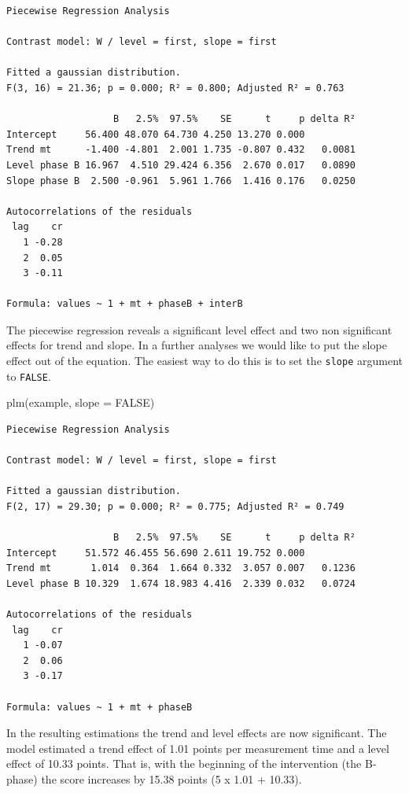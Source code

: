 \documentclass[
  letterpaper,
  DIV=11,
  numbers=noendperiod]{scrreprt}
\newenvironment{Shaded}{\begin{snugshade}}{\end{snugshade}}
\newcommand{\AttributeTok}[1]{\textcolor[rgb]{0.40,0.45,0.13}{#1}}
\newcommand{\ConstantTok}[1]{\textcolor[rgb]{0.56,0.35,0.01}{#1}}
\newcommand{\FunctionTok}[1]{\textcolor[rgb]{0.28,0.35,0.67}{#1}}
\newcommand{\NormalTok}[1]{\textcolor[rgb]{0.00,0.23,0.31}{#1}}
\begin{document}
\begin{verbatim}
Piecewise Regression Analysis

Contrast model: W / level = first, slope = first

Fitted a gaussian distribution.
F(3, 16) = 21.36; p = 0.000; R² = 0.800; Adjusted R² = 0.763

                   B   2.5%  97.5%    SE      t     p delta R²
Intercept     56.400 48.070 64.730 4.250 13.270 0.000         
Trend mt      -1.400 -4.801  2.001 1.735 -0.807 0.432   0.0081
Level phase B 16.967  4.510 29.424 6.356  2.670 0.017   0.0890
Slope phase B  2.500 -0.961  5.961 1.766  1.416 0.176   0.0250

Autocorrelations of the residuals
 lag    cr
   1 -0.28
   2  0.05
   3 -0.11

Formula: values ~ 1 + mt + phaseB + interB
\end{verbatim}

The piecewise regression reveals a significant level effect and two non
significant effects for trend and slope. In a further analyses we would
like to put the slope effect out of the equation. The easiest way to do
this is to set the \texttt{slope} argument to \texttt{FALSE}.

\begin{Shaded}
\begin{Highlighting}[]
\FunctionTok{plm}\NormalTok{(example, }\AttributeTok{slope =} \ConstantTok{FALSE}\NormalTok{)}
\end{Highlighting}
\end{Shaded}

\begin{verbatim}
Piecewise Regression Analysis

Contrast model: W / level = first, slope = first

Fitted a gaussian distribution.
F(2, 17) = 29.30; p = 0.000; R² = 0.775; Adjusted R² = 0.749

                   B   2.5%  97.5%    SE      t     p delta R²
Intercept     51.572 46.455 56.690 2.611 19.752 0.000         
Trend mt       1.014  0.364  1.664 0.332  3.057 0.007   0.1236
Level phase B 10.329  1.674 18.983 4.416  2.339 0.032   0.0724

Autocorrelations of the residuals
 lag    cr
   1 -0.07
   2  0.06
   3 -0.17

Formula: values ~ 1 + mt + phaseB
\end{verbatim}

In the resulting estimations the trend and level effects are now
significant. The model estimated a trend effect of 1.01 points per
measurement time and a level effect of 10.33 points. That is, with the
beginning of the intervention (the B-phase) the score increases by 15.38
points (5 x 1.01 + 10.33).
\end{document}
